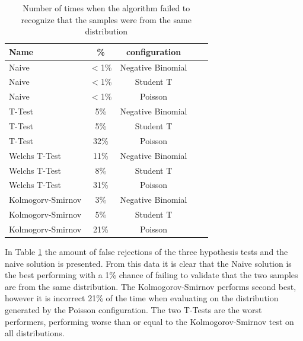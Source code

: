 \begin{table}[htp]
    \centering
    \begin{tabular}{lcccc}
        {\textbf Name}    & {\textbf \%} & {\textbf configuration} \\
        \hline
        Naive             & $<$1\%       & Negative Binomial       \\
        Naive             & $<$1\%       & Student T               \\
        Naive             & $<$1\%       & Poisson                 \\
        \hline
        T-Test            & 5\%          & Negative Binomial       \\
        T-Test            & 5\%          & Student T               \\
        T-Test            & 32\%         & Poisson                 \\
        \hline
        Welchs T-Test     & 11\%         & Negative Binomial       \\
        Welchs T-Test     & 8\%          & Student T               \\
        Welchs T-Test     & 31\%         & Poisson                 \\
        \hline
        Kolmogorv-Smirnov & 3\%          & Negative Binomial       \\
        Kolmogorv-Smirnov & 5\%          & Student T               \\
        Kolmogorv-Smirnov & 21\%         & Poisson                 \\
        \hline
    \end{tabular}
    \caption{Number of times when the algorithm failed to recognize that the samples were from the same distribution}
    \label{tab:false_rejects}
\end{table}

In Table \ref{tab:false_rejects} the amount of false rejections of the three hypothesis tests and the naive solution is presented. From this data it is clear that the Naive solution is the best performing with a 1\% chance of failing to validate that the two samples are from the same distribution. The Kolmogorov-Smirnov performs second best, however it is incorrect 21\% of the time when evaluating on the distribution generated by the Poisson configuration. The two T-Tests are the worst performers, performing worse than or equal to the Kolmogorov-Smirnov test on all distributions.

